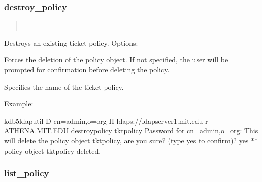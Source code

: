 \documentclass[letterpaper,10pt,english]{sphinxmanual}
\begin{document}
\subsubsection{destroy\_policy}
\label{\detokenize{admin/admin_commands/kdb5_ldap_util:destroy-policy}}\label{\detokenize{admin/admin_commands/kdb5_ldap_util:kdb5-ldap-util-view-policy-end}}\label{\detokenize{admin/admin_commands/kdb5_ldap_util:kdb5-ldap-util-destroy-policy}}\begin{quote}

\sphinxAtStartPar
{}
{[}\sphinxstylestrong{\sphinxhyphen{}force}{]}
\end{quote}

\sphinxAtStartPar
Destroys an existing ticket policy.  Options:
\begin{description}
\sphinxAtStartPar
Forces the deletion of the policy object.  If not specified, the
user will be prompted for confirmation before deleting the policy.

\sphinxAtStartPar
Specifies the name of the ticket policy.

\end{description}

\sphinxAtStartPar
Example:

\begin{sphinxVerbatim}[commandchars=\\\{\}]
kdb5\PYGZus{}ldap\PYGZus{}util \PYGZhy{}D cn=admin,o=org \PYGZhy{}H ldaps://ldap\PYGZhy{}server1.mit.edu
    \PYGZhy{}r ATHENA.MIT.EDU destroy\PYGZus{}policy tktpolicy
Password for \PYGZdq{}cn=admin,o=org\PYGZdq{}:
This will delete the policy object \PYGZsq{}tktpolicy\PYGZsq{}, are you sure?
(type \PYGZsq{}yes\PYGZsq{} to confirm)? yes
** policy object \PYGZsq{}tktpolicy\PYGZsq{} deleted.
\end{sphinxVerbatim}


\subsubsection{list\_policy}
\label{\detokenize{admin/admin_commands/kdb5_ldap_util:list-policy}}\label{\detokenize{admin/admin_commands/kdb5_ldap_util:kdb5-ldap-util-destroy-policy-end}}\label{\detokenize{admin/admin_commands/kdb5_ldap_util:kdb5-ldap-util-list-policy}}\begin{quote}

\sphinxAtStartPar
{}
\end{quote}
\end{document}
